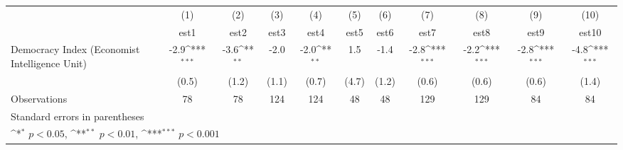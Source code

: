 {
\def\sym#1{\ifmmode^{#1}\else\(^{#1}\)\fi}
\begin{tabular}{l*{10}{c}}
\hline\hline
                    &\multicolumn{1}{c}{(1)}         &\multicolumn{1}{c}{(2)}         &\multicolumn{1}{c}{(3)}         &\multicolumn{1}{c}{(4)}         &\multicolumn{1}{c}{(5)}         &\multicolumn{1}{c}{(6)}         &\multicolumn{1}{c}{(7)}         &\multicolumn{1}{c}{(8)}         &\multicolumn{1}{c}{(9)}         &\multicolumn{1}{c}{(10)}         \\
                    &        est1         &        est2         &        est3         &        est4         &        est5         &        est6         &        est7         &        est8         &        est9         &       est10         \\
\hline
Democracy Index (Economist Intelligence Unit)&        -2.9\sym{***}&        -3.6\sym{**} &        -2.0         &        -2.0\sym{**} &         1.5         &        -1.4         &        -2.8\sym{***}&        -2.2\sym{***}&        -2.8\sym{***}&        -4.8\sym{***}\\
                    &       (0.5)         &       (1.2)         &       (1.1)         &       (0.7)         &       (4.7)         &       (1.2)         &       (0.6)         &       (0.6)         &       (0.6)         &       (1.4)         \\
\hline
Observations        &          78         &          78         &         124         &         124         &          48         &          48         &         129         &         129         &          84         &          84         \\
\hline\hline
\multicolumn{11}{l}{\footnotesize Standard errors in parentheses}\\
\multicolumn{11}{l}{\footnotesize \sym{*} \(p<0.05\), \sym{**} \(p<0.01\), \sym{***} \(p<0.001\)}\\
\end{tabular}
}
